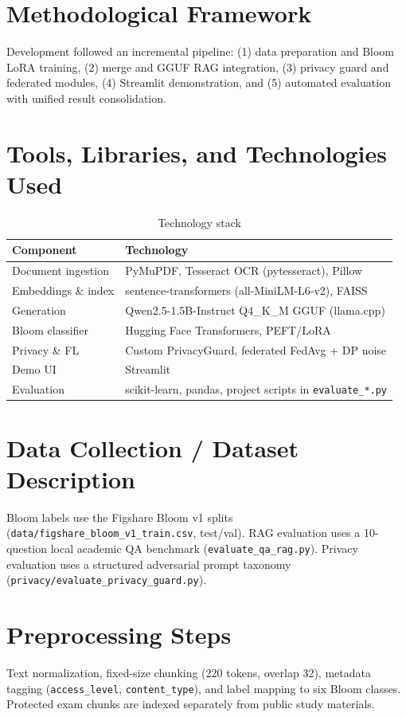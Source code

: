
\section{Methodological Framework}
Development followed an incremental pipeline: (1) data preparation and Bloom LoRA training, (2) merge and GGUF RAG integration, (3) privacy guard and federated modules, (4) Streamlit demonstration, and (5) automated evaluation with unified result consolidation.

\section{Tools, Libraries, and Technologies Used}
\begin{table}[H]
\centering
\caption{Technology stack}
\label{tab:stack}
\renewcommand{\arraystretch}{1.2}
\begin{tabular}{|p{4cm}|p{9cm}|}
\hline
\textbf{Component} & \textbf{Technology} \\
\hline
Document ingestion & PyMuPDF, Tesseract OCR (pytesseract), Pillow \\
\hline
Embeddings \& index & sentence-transformers (all-MiniLM-L6-v2), FAISS \\
\hline
Generation & Qwen2.5-1.5B-Instruct Q4\_K\_M GGUF (llama.cpp) \\
\hline
Bloom classifier & Hugging Face Transformers, PEFT/LoRA \\
\hline
Privacy \& FL & Custom PrivacyGuard, federated FedAvg + DP noise \\
\hline
Demo UI & Streamlit \\
\hline
Evaluation & scikit-learn, pandas, project scripts in \texttt{evaluate\_*.py} \\
\hline
\end{tabular}
\end{table}

\section{Data Collection / Dataset Description}
Bloom labels use the Figshare Bloom v1 splits (\texttt{data/figshare\_bloom\_v1\_train.csv}, test/val). RAG evaluation uses a 10-question local academic QA benchmark (\texttt{evaluate\_qa\_rag.py}). Privacy evaluation uses a structured adversarial prompt taxonomy (\texttt{privacy/evaluate\_privacy\_guard.py}).

\section{Preprocessing Steps}
Text normalization, fixed-size chunking (220 tokens, overlap 32), metadata tagging (\texttt{access\_level}, \texttt{content\_type}), and label mapping to six Bloom classes. Protected exam chunks are indexed separately from public study materials.

